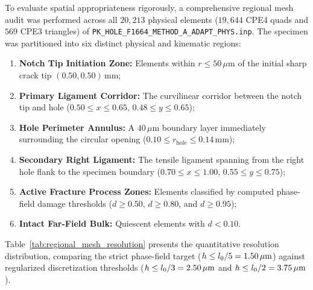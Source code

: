 To evaluate spatial appropriateness rigorously, a comprehensive regional mesh audit was performed across all $20{,}213$ physical elements ($19{,}644$ CPE4 quads and $569$ CPE3 triangles) of \texttt{PK\_HOLE\_F1664\_METHOD\_A\_ADAPT\_PHYS.inp}. The specimen was partitioned into six distinct physical and kinematic regions:
\begin{enumerate}
  \item \textbf{Notch Tip Initiation Zone:} Elements within $r \le 50\,\mu\mathrm{m}$ of the initial sharp crack tip $(0.50, 0.50)\,\mathrm{mm}$;
  \item \textbf{Primary Ligament Corridor:} The curvilinear corridor between the notch tip and hole ($0.50 \le x \le 0.65$, $0.48 \le y \le 0.65$);
  \item \textbf{Hole Perimeter Annulus:} A $40\,\mu\mathrm{m}$ boundary layer immediately surrounding the circular opening ($0.10 \le r_{\mathrm{hole}} \le 0.14\,\mathrm{mm}$);
  \item \textbf{Secondary Right Ligament:} The tensile ligament spanning from the right hole flank to the specimen boundary ($0.70 \le x \le 1.00$, $0.55 \le y \le 0.75$);
  \item \textbf{Active Fracture Process Zones:} Elements classified by computed phase-field damage thresholds ($d \ge 0.50$, $d \ge 0.80$, and $d \ge 0.95$);
  \item \textbf{Intact Far-Field Bulk:} Quiescent elements with $d < 0.10$.
\end{enumerate}

Table~\ref{tab:regional_mesh_resolution} presents the quantitative resolution distribution, comparing the strict phase-field target ($h \le l_0 / 5 = 1.50\,\mu\mathrm{m}$) against regularized discretization thresholds ($h \le l_0 / 3 = 2.50\,\mu\mathrm{m}$ and $h \le l_0 / 2 = 3.75\,\mu\mathrm{m}$).

